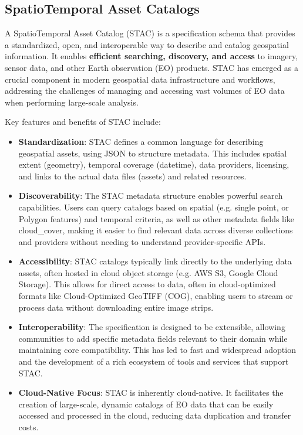 \begin{multicols}{2}
\subsection{SpatioTemporal Asset Catalogs}
\label{subsec:stac} %

A SpatioTemporal Asset Catalog (STAC) is a specification schema that provides a standardized, open, and interoperable way to describe and catalog geospatial information. 
It enables \textbf{efficient searching, discovery, and access} to imagery, sensor data, and other Earth observation (EO) products. 
STAC has emerged as a crucial component in modern geospatial data infrastructure and workflows, addressing the challenges of 
managing and accessing vast volumes of EO data when performing large-scale analysis.

Key features and benefits of STAC include:
\begin{itemize}
    \item \textbf{Standardization}: STAC defines a common language for describing geospatial assets, using JSON to structure metadata. 
    This includes spatial extent (geometry), temporal coverage (datetime), data providers, licensing, and links to the actual data files (assets) and related resources. 
    \item \textbf{Discoverability}: The STAC metadata structure enables powerful search capabilities. 
    Users can query catalogs based on spatial (e.g. single point, or Polygon features) and temporal criteria, as well as other metadata fields like cloud\_cover, making it easier to find relevant data across diverse collections and providers without needing to understand provider-specific APIs.
    \item \textbf{Accessibility}: STAC catalogs typically link directly to the underlying data assets, often hosted in cloud object storage (e.g. AWS S3, Google Cloud Storage). 
    This allows for direct access to data, often in cloud-optimized formats like Cloud-Optimized GeoTIFF (COG), 
    enabling users to stream or process data without downloading entire image strips.
    \item \textbf{Interoperability}: The specification is designed to be extensible, allowing communities to add specific metadata fields relevant to their domain 
    while maintaining core compatibility. This has led to fast and widespread adoption and the development of a rich ecosystem of tools and services that support STAC. 
    \item \textbf{Cloud-Native Focus}: STAC is inherently cloud-native. It facilitates the creation of large-scale, dynamic catalogs of EO data that can be easily accessed and processed in the cloud, reducing data duplication and transfer costs.
\end{itemize}


\end{multicols}
